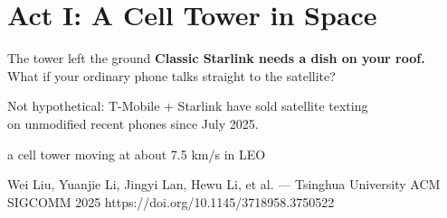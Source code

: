 
\section[Act I: Space]{Act I: A Cell Tower in Space}



\begin{frame}{The tower left the ground}
  \large\textbf{Classic Starlink needs a dish on your roof.}\\[0.3em]
  What if your ordinary phone talks straight to the satellite?

  \vspace{0.4em}
  \small
  Not hypothetical: T-Mobile + Starlink have sold satellite texting\\
  on unmodified recent phones since July 2025.

    {a cell tower moving at about 7.5 km/s in LEO}

  \vspace{0.4em}
    {Wei Liu, Yuanjie Li, Jingyi Lan, Hewu Li, et al. --- Tsinghua University}
    {ACM SIGCOMM 2025}
    {https://doi.org/10.1145/3718958.3750522}

\end{frame}

